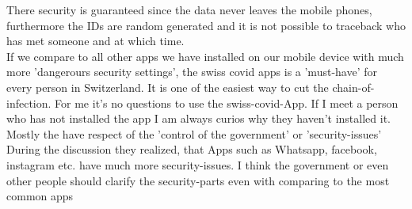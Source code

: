 \documentclass{report}
\begin{document}
There security is guaranteed since the data never leaves the mobile phones, furthermore the IDs are random generated and it is not possible to traceback who has met someone and at which time.\\

If we compare to all other apps we have installed on our mobile device with much more 'dangerours security settings', the swiss covid apps is a 'must-have' for every person in Switzerland. It is one of the easiest way to cut the chain-of-infection.
For me it's no questions to use the swiss-covid-App. If I meet a person who has not installed the app I am always curios why they haven't installed it. Mostly the have respect of the 'control of the government' or 'security-issues' 
During the discussion they realized, that Apps such as Whatsapp, facebook, instagram etc. have much more security-issues. I think the government or even other people should clarify the security-parts even with comparing to the most common apps
\end{document}
